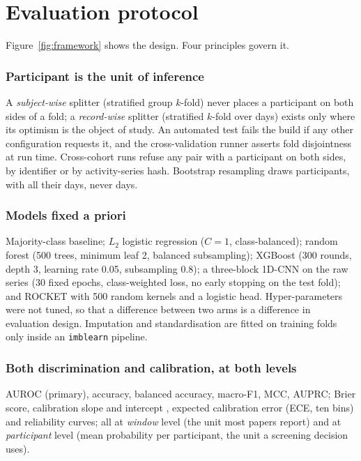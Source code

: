 \documentclass[journal]{IEEEtran}
\begin{document}
\section{Evaluation protocol}\label{sec:protocol}

Figure~\ref{fig:framework} shows the design. Four principles govern it.

\subsubsection{Participant is the unit of inference} A \emph{subject-wise} splitter (stratified group $k$-fold) never places a participant on both sides of a fold; a \emph{record-wise} splitter (stratified $k$-fold over days) exists only where its optimism is the object of study. An automated test fails the build if any other configuration requests it, and the cross-validation runner asserts fold disjointness at run time. Cross-cohort runs refuse any pair with a participant on both sides, by identifier or by activity-series hash. Bootstrap resampling draws participants, with all their days, never days.

\subsubsection{Models fixed a priori} Majority-class baseline; $L_2$ logistic regression ($C=1$, class-balanced); random forest (500 trees, minimum leaf 2, balanced subsampling); XGBoost (300 rounds, depth 3, learning rate 0.05, subsampling 0.8); a three-block 1D-CNN on the raw series (30 fixed epochs, class-weighted loss, no early stopping on the test fold); and ROCKET \cite{dempster2020} with 500 random kernels and a logistic head. Hyper-parameters were not tuned, so that a difference between two arms is a difference in evaluation design. Imputation and standardisation are fitted on training folds only inside an \texttt{imblearn} pipeline.

\subsubsection{Both discrimination and calibration, at both levels} AUROC (primary), accuracy, balanced accuracy, macro-F1, MCC, AUPRC; Brier score, calibration slope and intercept \cite{vancalster2019}, expected calibration error (ECE, ten bins) and reliability curves; all at \emph{window} level (the unit most papers report) and at \emph{participant} level (mean probability per participant, the unit a screening decision uses).
\end{document}
